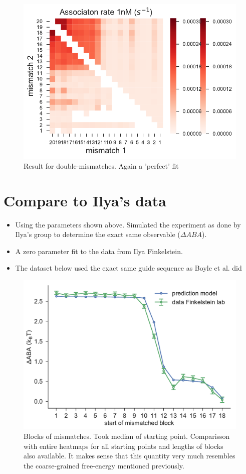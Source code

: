 \documentclass[a4paper,twoside]{revtex4-1}
\begin{document}
\begin{figure}[H]
\centering
\includegraphics[scale=0.5]{fig8_15_11_2018.pdf}
\caption{Result for double-mismatches. Again a 'perfect' fit}
\end{figure}



\section*{Compare to Ilya's data}
\begin{itemize}
\item Using the parameters shown above.  Simulated the experiment as done by Ilya's group to determine the exact same observable ($\Delta ABA$). 
\item A zero parameter fit to the data from Ilya Finkelstein. 
\item The dataset below used the exact same guide sequence as Boyle et al. did
\end{itemize}


\begin{figure}[H]
\centering
\includegraphics[scale=0.5]{fig9_15_11_2018.pdf}
\caption{Blocks of mismatches. Took median of starting point. Comparisson with entire heatmaps for all starting points and lengths of blocks also available. It makes sense that this quantity very much resembles the coarse-grained free-energy mentioned previously.}
\end{figure}
\end{document}
